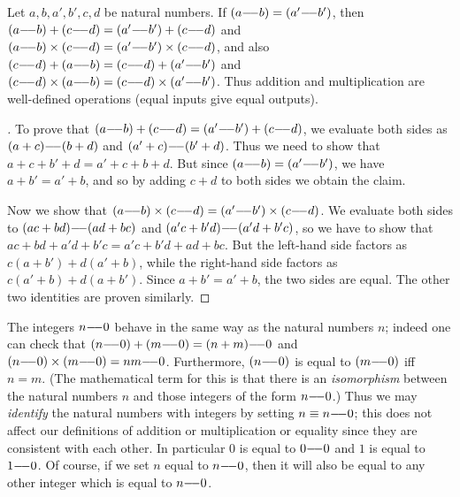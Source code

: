 \begin{lem}\label{i:4.1.3}
  Let \(a, b, a', b', c, d\) be natural numbers.
  If \((a {-}\!{-} b) = (a' {-}\!{-} b')\), then \((a {-}\!{-} b) + (c {-}\!{-} d) = (a' {-}\!{-} b') + (c {-}\!{-} d)\) and \((a {-}\!{-} b) \times (c {-}\!{-} d) = (a' {-}\!{-} b') \times (c {-}\!{-} d)\), and also \((c {-}\!{-} d) + (a {-}\!{-} b) = (c {-}\!{-} d) + (a' {-}\!{-} b')\) and \((c {-}\!{-} d) \times (a {-}\!{-} b) = (c {-}\!{-} d) \times (a' {-}\!{-} b')\).
  Thus addition and multiplication are well-defined operations (equal inputs give equal outputs).
\end{lem}

\begin{proof}[]
  To prove that \((a {-}\!{-} b) + (c {-}\!{-} d) = (a' {-}\!{-} b') + (c {-}\!{-} d)\), we evaluate both sides as \((a + c) {-}\!{-} (b + d)\) and \((a' + c) {-}\!{-} (b' + d)\).
  Thus we need to show that \(a + c + b' + d = a' + c + b + d\).
  But since \((a {-}\!{-} b) = (a' {-}\!{-} b')\), we have \(a + b' = a' + b\), and so by adding \(c + d\) to both sides we obtain the claim.

  Now we show that \((a {-}\!{-} b) \times (c {-}\!{-} d) = (a' {-}\!{-} b') \times (c {-}\!{-} d)\).
  We evaluate both sides to \((ac + bd) {-}\!{-} (ad + bc)\) and \((a'c + b'd) {-}\!{-} (a'd + b'c)\), so we have to show that \(ac + bd + a'd + b'c = a'c + b'd + ad + bc\).
  But the left-hand side factors as \(c(a + b') + d(a' + b)\), while the right-hand side factors as \(c(a' + b) + d(a + b')\).
  Since \(a + b' = a' + b\), the two sides are equal.
  The other two identities are proven similarly.
\end{proof}

\begin{ac}\label{i:ac:4.1.2}
  The integers \(n {-}\!{-} 0\) behave in the same way as the natural numbers \(n\);
  indeed one can check that \((n {-}\!{-} 0) + (m {-}\!{-} 0) = (n + m) {-}\!{-} 0\) and \((n {-}\!{-} 0) \times (m {-}\!{-} 0) = nm {-}\!{-} 0\).
  Furthermore, \((n {-}\!{-} 0)\) is equal to \((m {-}\!{-} 0)\) iff \(n = m\).
  (The mathematical term for this is that there is an \emph{isomorphism} between the natural numbers \(n\) and those integers of the form \(n {-}\!{-} 0\).)
  Thus we may \emph{identify} the natural numbers with integers by setting \(n \equiv n {-}\!{-} 0\);
  this does not affect our definitions of addition or multiplication or equality since they are consistent with each other.
  In particular \(0\) is equal to \(0 {-}\!{-} 0\) and \(1\) is equal to \(1 {-}\!{-} 0\).
  Of course, if we set \(n\) equal to \(n {-}\!{-} 0\), then it will also be equal to any other integer which is equal to \(n {-}\!{-} 0\).
\end{ac}


